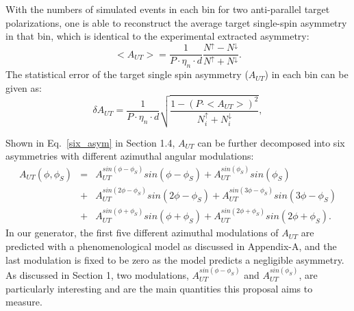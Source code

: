 With the numbers of  simulated events in each bin for two anti-parallel target polarizations, one is able to reconstruct the average target single-spin asymmetry in that bin, which is identical to the experimental extracted asymmetry:
\begin{equation}
   <A_{UT}> = \frac{1}{P\cdot\eta_{n}\cdot d} \frac{N^{\uparrow}-N^{\downarrow}}{N^{\uparrow}+N^{\downarrow}}.
   \label{asym_exp}
\end{equation}
The statistical error of the target single spin asymmetry ($A_{UT}$) in each
bin can be given as:
  \begin{equation}
    \delta A_{UT} = \frac{1}{P\cdot\eta_{n}\cdot d} \sqrt{\frac{1-(P\cdot
        <A_{UT}>)^{2}}{N^{\uparrow}_{i}+N^{\downarrow}_{i}}},
    \label{stat_err}
 \end{equation}
 

Shown in Eq.~\ref{six_asym} in Section 1.4,  $A_{UT}$  can be further decomposed into six asymmetries with different azimuthal angular modulations:
   \begin{eqnarray}
        A_{UT}(\phi, \phi_{S}) &=& A_{UT}^{sin(\phi-\phi_{S})} sin(\phi-\phi_{S})+ A_{UT}^{sin(\phi_{S})} sin(\phi_{S}) \nonumber \\
       &+& A_{UT}^{sin(2\phi-\phi_{S})} sin(2\phi-\phi_{S})+ A_{UT}^{sin(3\phi-\phi_{S})} sin(3\phi-\phi_{S}) \nonumber  \\
      &+& A_{UT}^{sin(\phi+\phi_{S})} sin(\phi+\phi_{S})+A_{UT}^{sin(2\phi+\phi_{S})} sin(2\phi+\phi_{S}).
   \end{eqnarray}
In our generator, the first five different azimuthal modulations of $A_{UT}$ are predicted with a phenomenological model as discussed in Appendix-A, and the last modulation is fixed to be zero as the model predicts a negligible asymmetry. As discussed in Section 1, two modulations, $A_{UT}^{sin(\phi-\phi_{S})} $ and $A_{UT}^{sin(\phi_{S})}$, are particularly interesting and are the main quantities this proposal aims to measure. 

